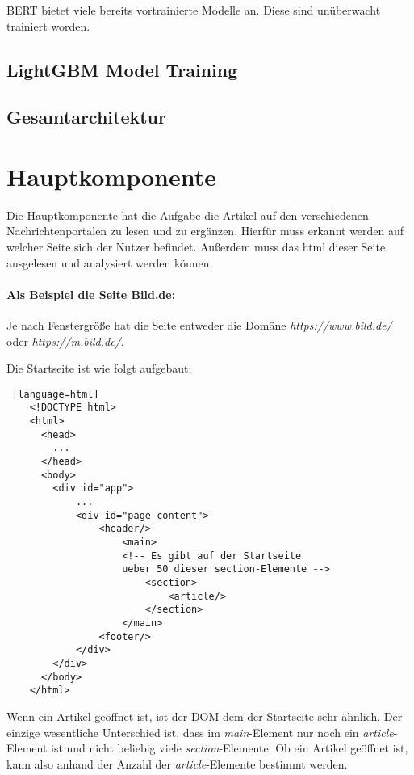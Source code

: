BERT bietet viele bereits vortrainierte Modelle an. Diese sind unüberwacht trainiert worden. 


\subsection{LightGBM Model Training}

\subsection{Gesamtarchitektur}

\section{Hauptkomponente} \label{sec:06:hauptkomponente}

Die Hauptkomponente hat die Aufgabe die Artikel auf den verschiedenen Nachrichtenportalen zu lesen und zu ergänzen.
Hierfür muss erkannt werden auf welcher Seite sich der Nutzer befindet. Außerdem muss das html dieser Seite ausgelesen und analysiert werden können.

\paragraph{Als Beispiel die Seite Bild.de:} 
Je nach Fenstergröße hat die Seite entweder die Domäne \textit{https://www.bild.de/} oder \textit{https://m.bild.de/}.

Die Startseite ist wie folgt aufgebaut:

\begin{lstlisting} [language=html]
    <!DOCTYPE html>
    <html>
      <head>
        ...
      </head>
      <body>
        <div id="app">
            ...
            <div id="page-content">
                <header/>
                    <main>
                    <!-- Es gibt auf der Startseite 
                    ueber 50 dieser section-Elemente -->
                        <section>
                            <article/>
                        </section>
                    </main>
                <footer/>
            </div>    
        </div>
      </body>
    </html>
\end{lstlisting}

Wenn ein Artikel geöffnet ist, ist der DOM dem der Startseite sehr ähnlich. Der einzige wesentliche Unterschied ist, dass im \textit{main}-Element
nur noch ein \textit{article}-Element ist und nicht beliebig viele \textit{section}-Elemente.
Ob ein Artikel geöffnet ist, kann also anhand der Anzahl der \textit{article}-Elemente bestimmt werden.

